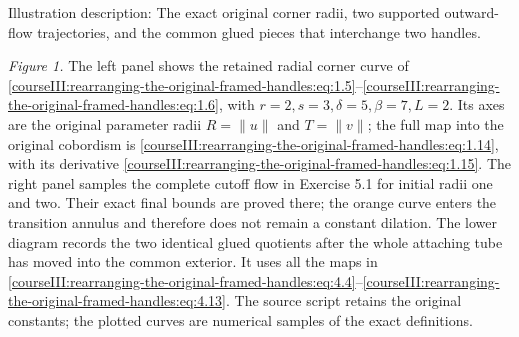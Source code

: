 Illustration description: The exact original corner radii, two supported outward-flow trajectories, and the common glued pieces that interchange two handles.

\emph{Figure 1.} The left panel shows the retained radial corner curve of \eqref{courseIII:rearranging-the-original-framed-handles:eq:1.5}--\eqref{courseIII:rearranging-the-original-framed-handles:eq:1.6}, with \(r=2,s=3,\delta=5,\beta=7,L=2\). Its axes are the original parameter radii \(R=\|u\|\) and \(T=\|v\|\); the full map into the original cobordism is \eqref{courseIII:rearranging-the-original-framed-handles:eq:1.14}, with its derivative \eqref{courseIII:rearranging-the-original-framed-handles:eq:1.15}. The right panel samples the complete cutoff flow in Exercise 5.1 for initial radii one and two. Their exact final bounds are proved there; the orange curve enters the transition annulus and therefore does not remain a constant dilation. The lower diagram records the two identical glued quotients after the whole attaching tube has moved into the common exterior. It uses all the maps in \eqref{courseIII:rearranging-the-original-framed-handles:eq:4.4}--\eqref{courseIII:rearranging-the-original-framed-handles:eq:4.13}. The source script retains the original constants; the plotted curves are numerical samples of the exact definitions.
